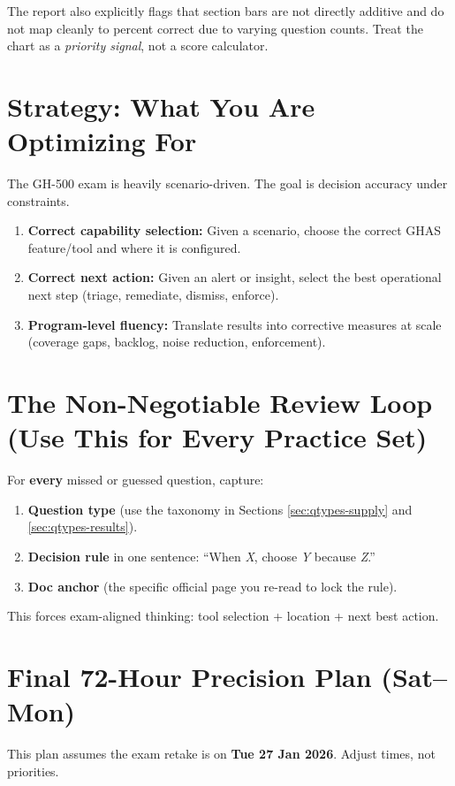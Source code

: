 \documentclass[11pt]{article}
\begin{document}
\noindent The report also explicitly flags that section bars are not directly additive and do not map cleanly to percent correct due to varying question counts. Treat the chart as a \emph{priority signal}, not a score calculator.

\section{Strategy: What You Are Optimizing For}
The GH-500 exam is heavily scenario-driven. The goal is decision accuracy under constraints.

\begin{enumerate}
  \item \textbf{Correct capability selection:} Given a scenario, choose the correct GHAS feature/tool and where it is configured.
  \item \textbf{Correct next action:} Given an alert or insight, select the best operational next step (triage, remediate, dismiss, enforce).
  \item \textbf{Program-level fluency:} Translate results into corrective measures at scale (coverage gaps, backlog, noise reduction, enforcement).
\end{enumerate}

\section{The Non-Negotiable Review Loop (Use This for Every Practice Set)}
For \textbf{every} missed or guessed question, capture:

\begin{enumerate}
  \item \textbf{Question type} (use the taxonomy in Sections \ref{sec:qtypes-supply} and \ref{sec:qtypes-results}).
  \item \textbf{Decision rule} in one sentence: ``When \emph{X}, choose \emph{Y} because \emph{Z}.''
  \item \textbf{Doc anchor} (the specific official page you re-read to lock the rule).
\end{enumerate}

\noindent This forces exam-aligned thinking: tool selection + location + next best action.

\clearpage
\section{Final 72-Hour Precision Plan (Sat--Mon)}
This plan assumes the exam retake is on \textbf{Tue 27 Jan 2026}. Adjust times, not priorities.
\end{document}
